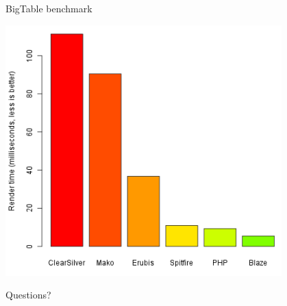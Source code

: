 \documentclass[20pt]{beamer}
\begin{document}
\begin{frame}{BigTable benchmark}
    \begin{center}
    \includegraphics[width=0.8\textwidth]{images/benchmarks.png}
    \end{center}
\end{frame}

\begin{frame}{Questions?}

\end{frame}
\end{document}
